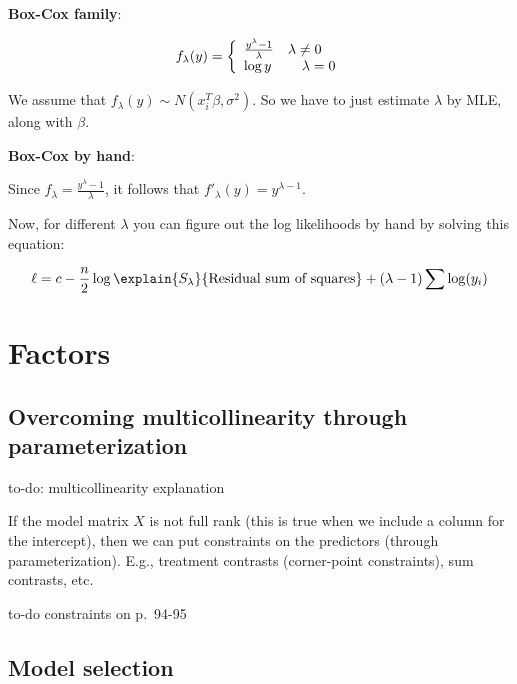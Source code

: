 \textbf{Box-Cox family}:

\begin{equation}
f_\lambda (y) = \left\{ 
\begin{array}{l l}
       \frac{y^\lambda - 1}{\lambda}   & \lambda \neq 0\\
       \log y & \quad \lambda=0\\
\end{array}
\right.
\end{equation}

We assume that $f_\lambda (y) \sim N(x_i^T \beta,\sigma^2)$. So we have to just estimate $\lambda$ by MLE, along with $\beta$.

\textbf{Box-Cox by hand}:

Since $f_\lambda=\frac{y^\lambda-1}{\lambda}$, it follows that $f'_\lambda(y)= y^{\lambda-1}$.

Now, for different $\lambda$ you can figure out the log likelihoods by hand by solving this equation:

\begin{equation}
\ell = c-\frac{n}{2} \log \explain{S_\lambda}{\hbox{Residual sum of squares}} + (\lambda-1)\sum \log (y_i)
\end{equation}

\section{Factors}

\subsection{Overcoming multicollinearity through parameterization}

to-do: multicollinearity explanation

If the model matrix $X$ is not full rank (this is true when we include a column for the intercept), then we can put constraints on the predictors (through parameterization). E.g., treatment contrasts (corner-point constraints), sum contrasts, etc.

to-do constraints on p.\ 94-95



\subsection{Model selection}

